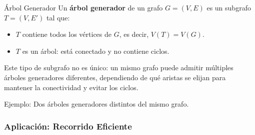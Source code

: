 \begin{definitionblock}{Árbol Generador}
Un \textbf{árbol generador} de un grafo $G = (V, E)$ es un subgrafo $T = (V, E')$ tal que:
\begin{itemize}
  \item $T$ contiene todos los vértices de $G$, es decir, $V(T) = V(G)$.
  \item $T$ es un árbol: está conectado y no contiene ciclos.
\end{itemize}
\end{definitionblock}


Este tipo de subgrafo no es único: un mismo grafo puede admitir múltiples árboles generadores diferentes, dependiendo de qué aristas se elijan para mantener la conectividad y evitar los ciclos.


\begin{exampleblock}{Ejemplo: Dos árboles generadores distintos del mismo grafo. }

\begin{center}
\hspace{1cm}
\end{center}
\end{exampleblock}

\medskip

\begin{center}
\end{center}

\subsubsection{Aplicación: Recorrido Eficiente}

